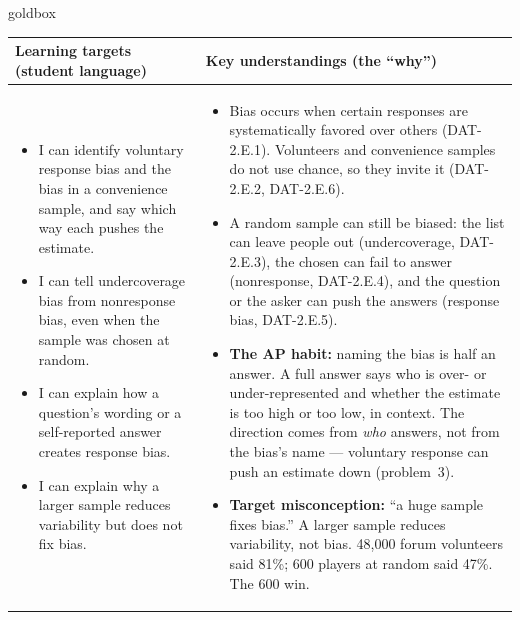 \documentclass[10pt]{article}
\begin{document}
\renewcommand{\arraystretch}{1.4}
\boxguard
\begin{skillbox}{goldbox}
\begin{tabularx}{\linewidth}{@{}X|X@{}}
\textbf{Learning targets (student language)} & \textbf{Key understandings (the ``why'')} \\[2pt]
\hline
\vspace{-6pt}
\begin{itemize}[leftmargin=1.1em, nosep, after=\vspace{2pt}]
  \item I can identify voluntary response bias and the bias in a convenience sample, and say
        which way each pushes the estimate.
  \item I can tell undercoverage bias from nonresponse bias, even when the sample was chosen
        at random.
  \item I can explain how a question's wording or a self-reported answer creates response
        bias.
  \item I can explain why a larger sample reduces variability but does not fix bias.
\end{itemize}
&
\vspace{-6pt}
\begin{itemize}[leftmargin=1.1em, nosep, after=\vspace{2pt}]
  \item Bias occurs when certain responses are systematically favored over others
        (DAT-2.E.1). Volunteers and convenience samples do not use chance, so they invite it
        (DAT-2.E.2, DAT-2.E.6).
  \item A random sample can still be biased: the list can leave people out (undercoverage,
        DAT-2.E.3), the chosen can fail to answer (nonresponse, DAT-2.E.4), and the question
        or the asker can push the answers (response bias, DAT-2.E.5).
  \item \textbf{The AP habit:} naming the bias is half an answer. A full answer says who is
        over- or under-represented and whether the estimate is too high or too low, in
        context. The direction comes from \emph{who} answers, not from the bias's name ---
        voluntary response can push an estimate down (problem~3).
  \item \textbf{Target misconception:} ``a huge sample fixes bias.'' A larger sample reduces
        variability, not bias. 48{,}000 forum volunteers said 81\%; 600 players at random
        said 47\%. The 600 win.
\end{itemize}
\end{tabularx}
\end{skillbox}
\end{document}
